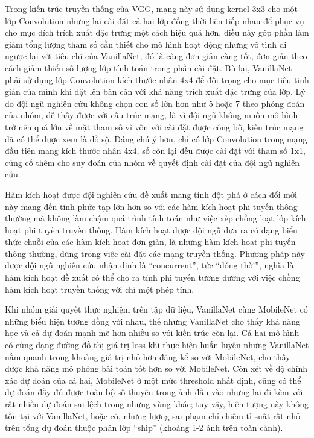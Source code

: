\documentclass[a4paper,12pt]{report}
\begin{document}
Trong kiến trúc truyền thống của VGG, mạng này sử dụng kernel 3x3 cho một lớp Convolution nhưng lại cài đặt cả hai lớp đồng thời liên tiếp nhau để phục vụ cho mục đích trích xuất đặc trưng một cách hiệu quả hơn, điều này góp phần làm giảm tổng lượng tham số cần thiết cho mô hình hoạt động nhưng vô tình đi ngược lại với tiêu chí của VanillaNet, đó là càng đơn giản càng tốt, đơn giản theo cách giảm thiểu số lượng lớp tính toán trong phần cài đặt. Bù lại, VanillaNet phải sử dụng lớp Convolution kích thước nhân 4x4 để đối trọng cho mục tiêu tinh giản của mình khi đặt lên bàn cân với khả năng trích xuất đặc trưng của lớp. Lý do đội ngũ nghiên cứu không chọn con số lớn hơn như 5 hoặc 7 theo phỏng đoán của nhóm, dễ thấy được với cấu trúc mạng, là vì đội ngũ không muốn mô hình trở nên quá lớn về mặt tham số vì vốn với cài đặt được công bố, kiến trúc mạng đã có thể được xem là đồ sộ. Đáng chú ý hơn, chỉ có lớp Convolution trong mạng đầu tiên mang kích thước nhân 4x4, số còn lại đều được cài đặt với tham số 1x1, củng cố thêm cho suy đoán của nhóm về quyết định cài đặt của đội ngũ nghiên cứu.

Hàm kích hoạt được đội nghiên cứu đề xuất mang tính đột phá ở cách đổi mới này mang đến tính phức tạp lớn hơn so với các hàm kích hoạt phi tuyến thông thường mà không làm chậm quá trình tính toán như việc xếp chồng loạt lớp kích hoạt phi tuyến truyền thống. Hàm kích hoạt được đội ngũ đưa ra có dạng biểu thức chuỗi của các hàm kích hoạt đơn giản, là những hàm kích hoạt phi tuyến thông thường, dùng trong việc cài đặt các mạng truyền thống. Phương pháp này được đội ngũ nghiên cứu nhận định là ``concurrent'', tức ``đồng thời'', nghĩa là hàm kích hoạt đề xuất có thể cho ra tính phi tuyến tương đương với việc chồng hàm kích hoạt truyền thống với chỉ một phép tính.

Khi nhóm giải quyết thực nghiệm trên tập dữ liệu, VanillaNet cùng MobileNet có những biểu hiện tương đồng với nhau, thế nhưng VanillaNet cho thấy khả năng học và cả dự đoán mạnh mẽ hơn nhiều so với kiến trúc còn lại. Cả hai mô hình có cùng dạng đường đồ thị giá trị loss khi thực hiện huấn luyện nhưng VanillaNet nằm quanh trong khoảng giá trị nhỏ hơn đáng kể so với MobileNet, cho thấy được khả năng mô phỏng bài toán tốt hơn so với MobileNet. Còn xét về độ chính xác dự đoán của cả hai, MobileNet ở một mức threshold nhất định, cũng có thể dự đoán đầy đủ được toàn bộ số thuyền trong ảnh đầu vào nhưng lại đi kèm với rất nhiều dự đoán sai lệch trong những vùng khác; tuy vậy, hiện tượng này không tồn tại với VanillaNet, hoặc có, nhưng lượng sai phạm chỉ chiếm tỉ suất rất nhỏ trên tổng dự đoán thuộc phân lớp ``ship'' (khoảng 1-2 ảnh trên toàn cảnh).
\end{document}
